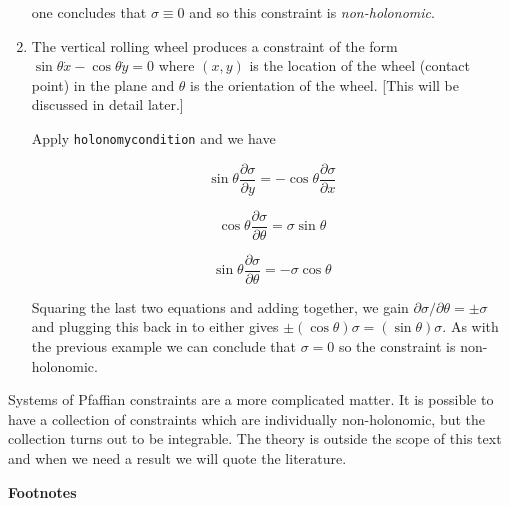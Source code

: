 \begin{enumerate}
  one concludes that \(\sigma \equiv 0\) and so this constraint is
  \emph{non-holonomic}.
\item
  The vertical rolling wheel produces a constraint of the form
  \(\sin \theta \dot{x} - \cos\theta \dot{y} = 0\) where \((x,y)\) is
  the location of the wheel (contact point) in the plane and \(\theta\)
  is the orientation of the wheel. {[}This will be discussed in detail
  later.{]}

  Apply \texttt{holonomycondition} and we have

  \[\sin\theta \frac{\partial \sigma}{\partial y} = -\cos\theta \frac{\partial \sigma}{\partial x}\]

  \[\cos\theta \frac{\partial \sigma}{\partial \theta} = \sigma \sin\theta\]

  \[\sin\theta \frac{\partial \sigma}{\partial \theta} = -\sigma \cos\theta\]

  Squaring the last two equations and adding together, we gain
  \(\partial \sigma / \partial \theta = \pm \sigma\) and plugging this
  back in to either gives
  \(\pm (\cos\theta) \sigma = (\sin\theta) \sigma\). As with the
  previous example we can conclude that \(\sigma = 0\) so the constraint
  is non-holonomic.
\end{enumerate}

Systems of Pfaffian constraints are a more complicated matter. It is
possible to have a collection of constraints which are individually
non-holonomic, but the collection turns out to be integrable. The theory
is outside the scope of this text and when we need a result we will
quote the literature.

\textbf{Footnotes}

